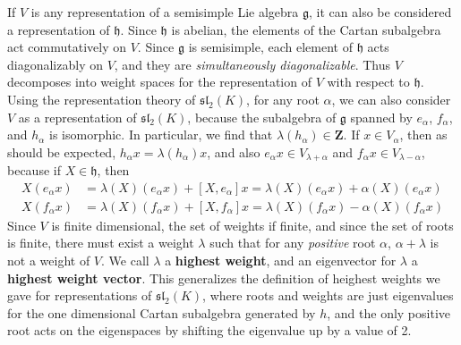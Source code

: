 If $V$ is any representation of a semisimple Lie algebra $\mathfrak{g}$, it can also be considered a representation of $\mathfrak{h}$. Since $\mathfrak{h}$ is abelian, the elements of the Cartan subalgebra act commutatively on $V$. Since $\mathfrak{g}$ is semisimple, each element of $\mathfrak{h}$ acts diagonalizably on $V$, and they are {\it simultaneously diagonalizable}. Thus $V$ decomposes into weight spaces for the representation of $V$ with respect to $\mathfrak{h}$. Using the representation theory of $\mathfrak{sl}_2(K)$, for any root $\alpha$, we can also consider $V$ as a representation of $\mathfrak{sl}_2(K)$, because the subalgebra of $\mathfrak{g}$ spanned by $e_\alpha$, $f_\alpha$, and $h_\alpha$ is isomorphic. In particular, we find that $\lambda(h_\alpha) \in \mathbf{Z}$. If $x \in V_\alpha$, then as should be expected, $h_\alpha x = \lambda(h_\alpha) x$, and also $e_\alpha x \in V_{\lambda + \alpha}$ and $f_\alpha x \in V_{\lambda - \alpha}$, because if $X \in \mathfrak{h}$, then
%
\begin{align*}
    X(e_\alpha x) &= \lambda(X) (e_\alpha x) + [X,e_\alpha]x = \lambda(X) (e_\alpha x) + \alpha(X) (e_\alpha x)\\
    X(f_\alpha x) &= \lambda(X) (f_\alpha x) + [X,f_\alpha]x = \lambda(X) (f_\alpha x) - \alpha(X) (f_\alpha x)
\end{align*}
%
Since $V$ is finite dimensional, the set of weights if finite, and since the set of roots is finite, there must exist a weight $\lambda$ such that for any {\it positive} root $\alpha$, $\alpha + \lambda$ is not a weight of $V$. We call $\lambda$ a {\bf highest weight}, and an eigenvector for $\lambda$ a {\bf highest weight vector}. This generalizes the definition of heighest weights we gave for representations of $\mathfrak{sl}_2(K)$, where roots and weights are just eigenvalues for the one dimensional Cartan subalgebra generated by $h$, and the only positive root acts on the eigenspaces by shifting the eigenvalue up by a value of 2.

